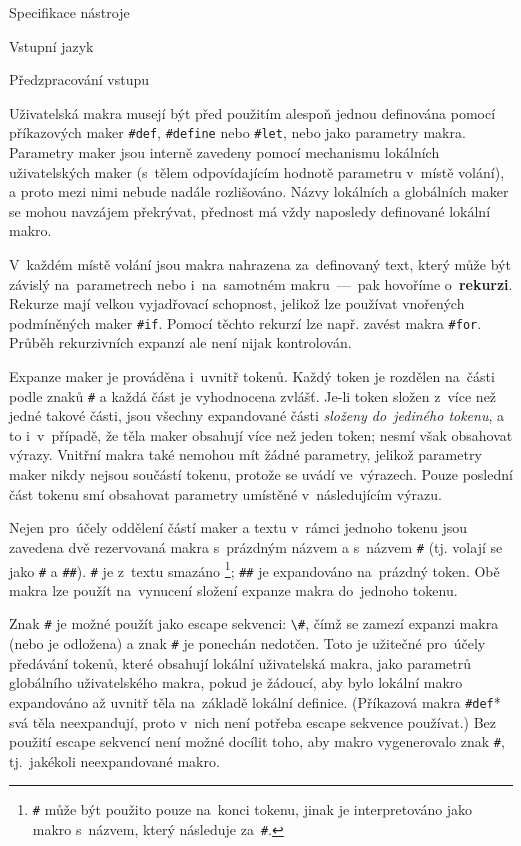 \documentclass[thesis=M,czech]{FITthesis}[2012/06/26]
\newcommand{\id}[1]{\texttt{#1}}
\newcommand{\hl}[1]{\textit{#1}}
\newcommand{\hll}[1]{\textbf{#1}}
\begin{document}
\begin{section}{Specifikace nástroje}
\begin{subsection}{Vstupní jazyk}
\begin{subsubsection}{Předzpracování vstupu}

\begin{paragraph}{Uživatelská makra}
\label{p:design:spec:ilang:macros:user}
musejí být před použitím alespoň jednou definována
pomocí příkazových maker \id{\#def}, \id{\#define} nebo \id{\#let},
nebo jako parametry makra.
Parametry maker jsou interně zavedeny pomocí mechanismu
lokálních uživatelských maker
(s~tělem odpovídajícím hodnotě parametru v~místě volání),
a proto mezi nimi
nebude nadále rozlišováno.
Názvy lokálních a globálních maker se mohou navzájem překrývat,
přednost má vždy naposledy definované lokální makro.

V~každém místě volání jsou makra nahrazena za~definovaný text,
který může být závislý na~parametrech
nebo i~na~samotném makru~---~pak hovoříme o~\hll{rekurzi}.
Rekurze mají velkou vyjadřovací schopnost,
jelikož lze používat vnořených podmíněných maker \id{\#if}.
Pomocí těchto rekurzí lze např. zavést
makra \id{\#for}.
Průběh rekurzivních expanzí ale není nijak kontrolován.

Expanze maker je prováděna i~uvnitř tokenů.
Každý token je rozdělen na~části
podle znaků \id{\#}
a každá část je vyhodnocena zvlášť.
Je-li token složen z~více než jedné takové části,
jsou všechny expandované části \hl{složeny do~jediného tokenu},
a to i~v~případě, že těla maker obsahují více než jeden token;
nesmí však obsahovat výrazy.
Vnitřní makra také nemohou mít žádné parametry,
jelikož parametry maker nikdy nejsou součástí tokenu,
protože se uvádí ve~výrazech.
Pouze poslední část tokenu smí obsahovat parametry
umístěné v~následujícím výrazu.

Nejen pro~účely oddělení částí maker a textu v~rámci jednoho tokenu
jsou zavedena dvě rezervovaná makra s~prázdným názvem
a s~názvem \id{\#}
(tj. volají se jako \id{\#} a \id{\#\#}).
\id{\#} je z~textu smazáno%
\footnote{\id{\#} může být použito pouze na~konci tokenu,
jinak je interpretováno jako makro s~názvem,
který následuje za~\id{\#}.};
\id{\#\#} je expandováno na~prázdný token.
Obě makra lze použít na~vynucení složení expanze makra do~jednoho tokenu.

Znak \id{\#} je možné použít jako escape sekvenci:
\id{\textbackslash\#},
čímž se zamezí expanzi makra (nebo je odložena)
a znak \id{\#} je ponechán nedotčen.
Toto je užitečné pro~účely předávání
tokenů, které obsahují lokální uživatelská makra,
jako parametrů globálního uživatelského makra,
pokud je žádoucí, aby bylo lokální makro expandováno až uvnitř těla
na~základě lokální definice.
(Příkazová makra \id{\#def}* svá těla neexpandují,
proto v~nich není potřeba escape sekvence používat.)
Bez použití escape sekvencí
není možné docílit toho, aby makro vygenerovalo znak \id{\#},
tj.~jakékoli neexpandované makro.


\end{paragraph}
\end{subsubsection}
\end{subsection}
\end{section}
\end{document}
